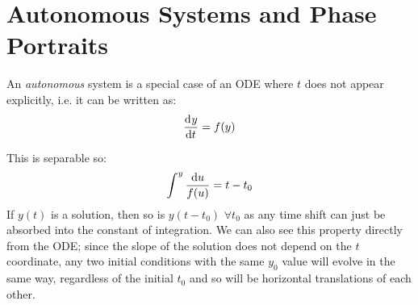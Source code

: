 \documentclass[../main.tex]{subfiles}
\begin{document}
\section{Autonomous Systems and Phase Portraits}
\label{autoAndPhaseSec}
\begin{definition}
  An \textit{autonomous} system is a special case of an ODE where $t$ does not appear explicitly, i.e. it can be written as:
  \[
    \deriv{y}{t} = f(y)
  \]
\end{definition}
This is separable so:
\[
  \int_{}^{y} \frac{\d{u}}{f(u)} = t - t_0
\]
If $y(t)$ is a solution, then so is $y(t - t_0)$ $\forall t_0$ as any time shift can just be absorbed into the constant of integration.
We can also see this property directly from the ODE; since the slope of the solution does not depend on the $t$ coordinate, any two initial conditions with the same $y_0$ value will evolve in the same way, regardless of the initial $t_0$ and so will be horizontal translations of each other.
\end{document}
